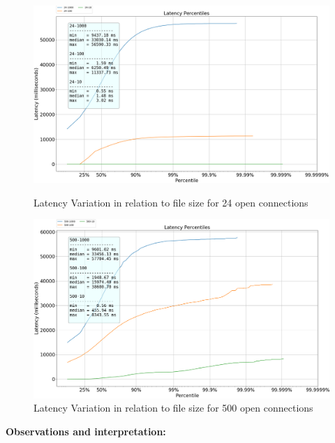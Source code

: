 \documentclass[runningheads]{llncs}
\begin{document}
\begin{figure}
    \centering
    \begin{minipage}{0.49\textwidth}
        \centering
        \includegraphics[width=1\textwidth]{plotcon24.png}
        \caption{Latency Variation in relation to file size for 24 open connections}
		\label {fig:latency-to-size-24}
    \end{minipage}\hfill
    \begin{minipage}{0.49\textwidth}
        \centering
        \includegraphics[width=1\textwidth]{plotcon500.png}
        \caption{Latency Variation in relation to file size for 500 open connections}
		\label {fig:latency-to-size-500}
    \end{minipage}
\end{figure}
\textbf{Observations and interpretation:}
\end{document}
